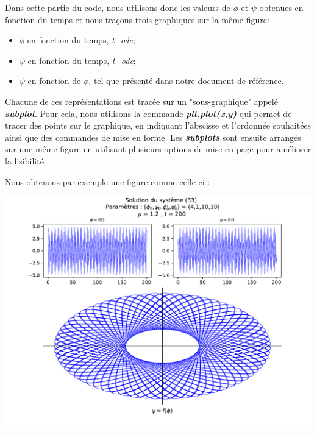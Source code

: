 \documentclass[11pt,a4paper]{article}
\begin{document}
Dans cette partie du code, nous utilisons donc les valeurs de $\phi$ et $\psi$ obtenues en fonction du temps et nous traçons trois graphiques sur la même figure:
\vspace{0.2cm}
\begin{itemize}
\item $\phi$ en fonction du temps, \textit{t\_ode};
\item $\psi$ en fonction du temps, \textit{t\_ode};
\item $\psi$ en fonction de $\phi$, tel que présenté dans notre document de référence.
\end{itemize}
\vspace{0.2cm}
    Chacune de ces représentations est tracée sur un "sous-graphique" appelé \textit{\textbf{subplot}}. Pour cela, nous utilisons la commande \textit{\textbf{plt.plot(x,y)}} qui permet de tracer des points sur le graphique, en indiquant l'abscisse et l'ordonnée souhaitées ainsi que des commandes de mise en forme.
Les \textit{\textbf{subplots}} sont ensuite arrangés sur une même figure en utilisant plusieurs options de mise en page pour améliorer la lisibilité.

Nous obtenons par exemple une figure comme celle-ci :\\
 \begin{center}
 \includegraphics[scale=0.7]{REGIME1_ODE33.pdf}
 \end{center}

    
\end{document}
